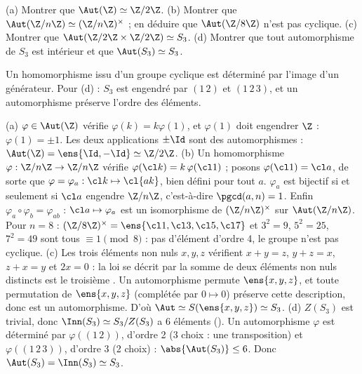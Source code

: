 \begin{exo}
(a) Montrer que $\Aut(\Z)\simeq\Z/2\Z$. (b) Montrer que $\Aut(\Z/n\Z)\simeq(\Z/n\Z)^\times$ ; en déduire que $\Aut(\Z/8\Z)$ n'est pas cyclique. (c) Montrer que $\Aut(\Z/2\Z\times\Z/2\Z)\simeq S_3$. (d) Montrer que tout automorphisme de $S_3$ est intérieur et que $\Aut(S_3)\simeq S_3$.
\begin{indication}
Un homomorphisme issu d'un groupe cyclique est déterminé par l'image d'un générateur. Pour (d) : $S_3$ est engendré par $(1\,2)$ et $(1\,2\,3)$, et un automorphisme préserve l'ordre des éléments.
\end{indication}
\begin{corrige}
(a) $\varphi\in\Aut(\Z)$ vérifie $\varphi(k)=k\varphi(1)$, et $\varphi(1)$ doit engendrer $\Z$ : $\varphi(1)=\pm1$. Les deux applications $\pm\Id$ sont des automorphismes : $\Aut(\Z)=\ens{\Id,-\Id}\simeq\Z/2\Z$.
(b) Un homomorphisme $\varphi:\Z/n\Z\to\Z/n\Z$ vérifie $\varphi(\cl k)=k\,\varphi(\cl1)$ ; posons $\varphi(\cl1)=\cl a$, de sorte que $\varphi=\varphi_a:\cl k\mapsto\cl{ak}$, bien défini pour tout $a$. $\varphi_a$ est bijectif si et seulement si $\cl a$ engendre $\Z/n\Z$, c'est-à-dire $\pgcd(a,n)=1$. Enfin $\varphi_a\circ\varphi_b=\varphi_{ab}$ : $\cl a\mapsto\varphi_a$ est un isomorphisme de $(\Z/n\Z)^\times$ sur $\Aut(\Z/n\Z)$. Pour $n=8$ : $(\Z/8\Z)^\times=\ens{\cl1,\cl3,\cl5,\cl7}$ et $3^2=9$, $5^2=25$, $7^2=49$ sont tous $\equiv1\pmod8$ : pas d'élément d'ordre 4, le groupe n'est pas cyclique.
(c) Les trois éléments non nuls $x,y,z$ vérifient $x+y=z$, $y+z=x$, $z+x=y$ et $2x=0$ : la loi se décrit par \og la somme de deux éléments non nuls distincts est le troisième \fg. Un automorphisme permute $\ens{x,y,z}$, et toute permutation de $\ens{x,y,z}$ (complétée par $0\mapsto0$) préserve cette description, donc est un automorphisme. D'où $\Aut\simeq S(\ens{x,y,z})\simeq S_3$.
(d) $Z(S_3)$ est trivial, donc $\Inn(S_3)\simeq S_3/Z(S_3)$ a 6 éléments (). Un automorphisme $\varphi$ est déterminé par $\varphi((1\,2))$, d'ordre 2 (3 choix : une transposition) et $\varphi((1\,2\,3))$, d'ordre 3 (2 choix) : $\abs{\Aut(S_3)}\le6$. Donc $\Aut(S_3)=\Inn(S_3)\simeq S_3$.
\end{corrige}
\end{exo}

